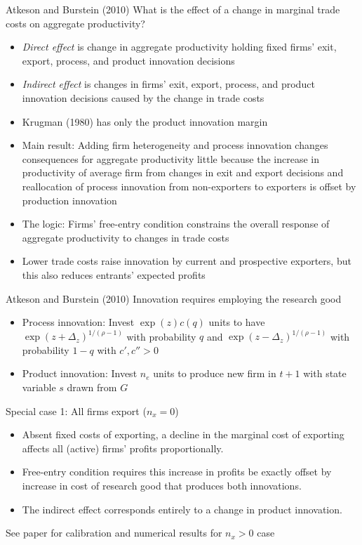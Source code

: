 \documentclass[10pt,notes=hide]{beamer}
\begin{document}
\begin{frame}{Atkeson and Burstein (2010)}
What is the effect of a change in marginal trade costs on aggregate productivity?
\begin{itemize}
\item \textit{Direct effect} is change in aggregate productivity holding fixed firms' exit, export, process, and product innovation decisions
\item \textit{Indirect effect} is changes in firms' exit, export, process, and product innovation decisions caused by the change in trade costs
\item Krugman (1980) has only the product innovation margin
\item Main result: Adding firm heterogeneity and process innovation changes consequences for aggregate productivity little because 
the increase in productivity of average firm 
from changes in exit and export decisions and reallocation of process innovation from non-exporters to exporters 
is offset by production innovation
\item The logic: Firms' free-entry condition constrains the overall response of aggregate productivity to changes in trade costs
\item Lower trade costs raise innovation by current and prospective exporters, but this also reduces entrants' expected profits
\end{itemize}
\end{frame}
\begin{frame}{Atkeson and Burstein (2010)}
Innovation requires employing the research good
\begin{itemize}
	\item Process innovation: Invest $\exp(z)c(q)$ units to have 
	$\exp(z+\Delta_z)^{1/(\rho-1)}$ with probability $q$
	and
	$\exp(z-\Delta_z)^{1/(\rho-1)}$ with probability $1-q$
	with $c',c''>0$
	\item Product innovation: Invest $n_e$ units to produce new firm in $t+1$ with state variable $s$ drawn from $G$
\end{itemize}
Special case 1: All firms export ($n_x=0$)
\begin{itemize}
\item Absent fixed costs of exporting, a decline in the marginal cost of exporting affects all (active) firms' profits proportionally.
\item Free-entry condition requires this increase in profits be exactly offset by increase in cost of research good that produces both innovations.
\item The indirect effect corresponds entirely to a change in product innovation.
\end{itemize}
See paper for calibration and numerical results for $n_x>0$ case
\end{frame}
\end{document}
